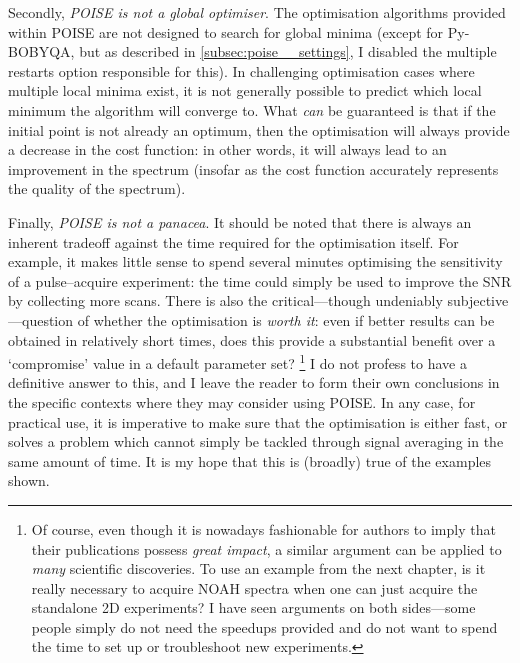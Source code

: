 Secondly, \textit{POISE is not a global optimiser}.
The optimisation algorithms provided within POISE are not designed to search for global minima (except for Py-BOBYQA, but as described in \cref{subsec:poise__settings}, I disabled the multiple restarts option responsible for this).
In challenging optimisation cases where multiple local minima exist, it is not generally possible to predict which local minimum the algorithm will converge to.
What \textit{can} be guaranteed is that if the initial point is not already an optimum, then the optimisation will always provide a decrease in the cost function: in other words, it will always lead to an improvement in the spectrum (insofar as the cost function accurately represents the quality of the spectrum).

Finally, \textit{POISE is not a panacea}.
It should be noted that there is always an inherent tradeoff against the time required for the optimisation itself.
For example, it makes little sense to spend several minutes optimising the sensitivity of a pulse--acquire experiment: the time could simply be used to improve the SNR by collecting more scans.
There is also the critical---though undeniably subjective---question of whether the optimisation is \textit{worth it}: even if better results can be obtained in relatively short times, does this provide a substantial benefit over a `compromise' value in a default parameter set?%
\footnote{Of course, even though it is nowadays fashionable for authors to imply that their publications possess \textit{great impact}, a similar argument can be applied to \textit{many} scientific discoveries. To use an example from the next chapter, is it really necessary to acquire NOAH spectra when one can just acquire the standalone 2D experiments? I have seen arguments on both sides---some people simply do not need the speedups provided and do not want to spend the time to set up or troubleshoot new experiments.}
I do not profess to have a definitive answer to this, and I leave the reader to form their own conclusions in the specific contexts where they may consider using POISE.
In any case, for practical use, it is imperative to make sure that the optimisation is either fast, or solves a problem which cannot simply be tackled through signal averaging in the same amount of time.
It is my hope that this is (broadly) true of the examples shown.
